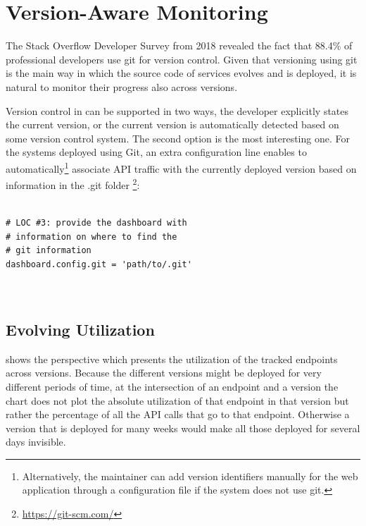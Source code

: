   
  \section{Version-Aware Monitoring}
  
  The Stack Overflow Developer Survey from 2018 revealed the fact that 88.4\% of professional developers use git for version control. 
  Given that versioning using git is the main way in which the source code of services evolves and is deployed, it is natural to monitor their progress also across versions. 

  Version control in \tool can be supported in two ways,
  the developer explicitly states the current version, 
  or the current version is automatically detected based
  on some version control system. 
  The second option is the most interesting one.
  For the systems deployed using Git, an extra configuration line enables \tool to automatically\footnote{Alternatively, the maintainer can add version identifiers manually for the web application through a configuration file if the system does not use git.} associate API traffic with the currently deployed version based on information in the .git folder \footnote{\url{https://git-scm.com/}}: 
    
\begin{lstlisting}[style=custompython]

# LOC #3: provide the dashboard with 
# information on where to find the 
# git information 
dashboard.config.git = 'path/to/.git'
  
      
\end{lstlisting}  
 

  

  \subsection*{Evolving Utilization}

   shows the  perspective which presents the utilization of the tracked endpoints across versions. Because the different versions might be deployed for very different periods of time, at the intersection of an endpoint and a version the chart does not plot the absolute utilization of that endpoint in that version but rather the percentage of all the API calls that go to that endpoint. Otherwise a version that is deployed for many weeks would make all those deployed for several days invisible.


